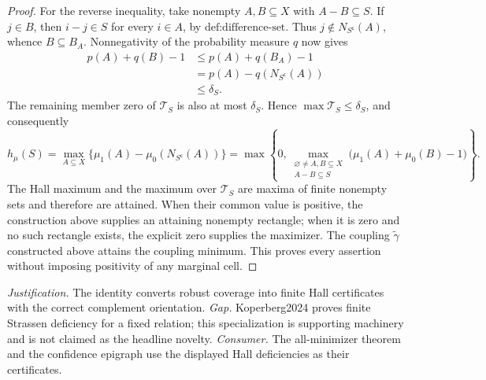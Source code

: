 \documentclass{article}
\begin{document}
\begin{proof}
For the reverse inequality, take nonempty \(A,B\subseteq X\) with \(A-B\subseteq S\).  If \(j\in B\), then \(i-j\in S\) for every \(i\in A\), by \(\text{def:difference-set}\).  Thus \(j\notin N_{S^{\mathsf c}}(A)\), whence \(B\subseteq B_A\).  Nonnegativity of the probability measure \(q\) now gives
\[
\begin{aligned}
p(A)+q(B)-1
&\leq p(A)+q(B_A)-1\\
&=p(A)-q(N_{S^{\mathsf c}}(A))\\
&\leq\delta_S.
\end{aligned}
\]
The remaining member zero of \(\mathcal T_S\) is also at most \(\delta_S\).  Hence \(\max\mathcal T_S\leq\delta_S\), and consequently
\[
h_\mu(S)
=\max_{A\subseteq X}\{\mu_1(A)-\mu_0(N_{S^{\mathsf c}}(A))\}
=\max\!\left\{0,
\max_{\substack{\varnothing\neq A,B\subseteq X\\A-B\subseteq S}}
\bigl(\mu_1(A)+\mu_0(B)-1\bigr)\right\}.
\]
The Hall maximum and the maximum over \(\mathcal T_S\) are maxima of finite nonempty sets and therefore are attained.  When their common value is positive, the construction above supplies an attaining nonempty rectangle; when it is zero and no such rectangle exists, the explicit zero supplies the maximizer.  The coupling \(\widetilde\gamma\) constructed above attains the coupling minimum.  This proves every assertion without imposing positivity of any marginal cell.
\end{proof}
\par\smallskip\noindent \textit{Justification.} The identity converts robust coverage into finite Hall certificates with the correct complement orientation. \textit{Gap.} Koperberg2024 proves finite Strassen deficiency for a fixed relation; this specialization is supporting machinery and is not claimed as the headline novelty. \textit{Consumer.} The all-minimizer theorem and the confidence epigraph use the displayed Hall deficiencies as their certificates.
\end{document}
